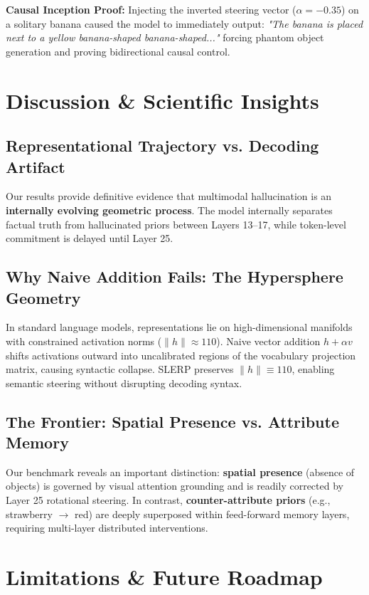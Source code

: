 \documentclass[11pt]{article}
\begin{document}
\noindent
\textbf{Causal Inception Proof:} Injecting the inverted steering vector ($\alpha = -0.35$) on a solitary banana caused the model to immediately output: \textit{"The banana is placed next to a yellow banana-shaped banana-shaped..."} forcing phantom object generation and proving bidirectional causal control.

\section{Discussion \& Scientific Insights}

\subsection{Representational Trajectory vs. Decoding Artifact}
Our results provide definitive evidence that multimodal hallucination is an \textbf{internally evolving geometric process}. The model internally separates factual truth from hallucinated priors between Layers 13--17, while token-level commitment is delayed until Layer 25.

\subsection{Why Naive Addition Fails: The Hypersphere Geometry}
In standard language models, representations lie on high-dimensional manifolds with constrained activation norms ($\|h\| \approx 110$). Naive vector addition $h + \alpha v$ shifts activations outward into uncalibrated regions of the vocabulary projection matrix, causing syntactic collapse. SLERP preserves $\|h\| \equiv 110$, enabling semantic steering without disrupting decoding syntax.

\subsection{The Frontier: Spatial Presence vs. Attribute Memory}
Our benchmark reveals an important distinction: \textbf{spatial presence} (absence of objects) is governed by visual attention grounding and is readily corrected by Layer 25 rotational steering. In contrast, \textbf{counter-attribute priors} (e.g., strawberry $\to$ red) are deeply superposed within feed-forward memory layers, requiring multi-layer distributed interventions.

\section{Limitations \& Future Roadmap}
\end{document}

